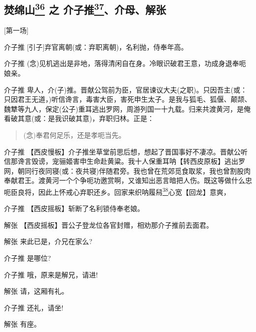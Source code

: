 \setcounter{page}{1}

%
%
%


\newpage
\hypertarget{ux711aux7ef5ux5c71-ux4e4b-ux4ecbux5b50ux63a8ux4ecbux6bcdux89e3ux5f20}{%
\subsection{\texorpdfstring{焚绵山\protect\hyperlink{fn36}{\textsuperscript{36}}
之
介子推\protect\hyperlink{fn37}{\textsuperscript{37}}、介母、解张}{焚绵山36 之 介子推37、介母、解张}}\label{ux711aux7ef5ux5c71-ux4e4b-ux4ecbux5b50ux63a8ux4ecbux6bcdux89e3ux5f20}}

{[}第一场{]}

介子推 {[}引子{]}弃官离朝(或：弃职离朝)，名利抛，侍奉年高。

介子推
(念)见机逃出是非地，落得清闲自在身。冷眼识破君王意，功成身退奉呃娘亲。

介子推
卑人，介(子)推。晋献公驾前为臣，官居谏议大夫(之职)。只因吾主(或：只因君王无道，)听信谗言，毒害大臣，害死申生太子。是我与狐毛、狐偃、颠颉、魏犨等九人，保定(公子)重耳逃出罗网，周游列国一十九载。归来共渡黄河，是俺看破其意(或：是我识破其意)，弃职归林。正是：

\begin{quote}
(念)奉君何足乐，还是孝呃当先。
\end{quote}

介子推
【西皮慢板】介子推坐草堂前思后想，想起了晋国事好不凄凉。晋献公听信那谗言毁谤，宠骊姬害申生命赴黄粱。我十人保重耳呐【转西皮原板】逃出罗网，朝同行夜同寝(或：夜共寝)伴随君旁。我也曾在荒郊觅食取浆，我也曾割股肉奉献君王。渡黄河一个个争呃功邀赏啊，又谁知出恶言暗把人伤。既这等做什么忠呃臣良将，因此上怀戒心弃职还乡。回家来织呐履舄\protect\hyperlink{fn38}{\textsuperscript{38}}心宽【回龙】意爽，

介子推 【西皮摇板】斩断了名利锁侍奉老娘。

解张 【西皮摇板】晋公子登龙位各官封赠，相劝那介子推前去面君。

解张 来此已是，介兄在家么?

介子推 是哪位?

介子推 哦，原来是解兄，请进!

解张 请，这厢有礼。

介子推 还礼，请坐!

解张 有座。

